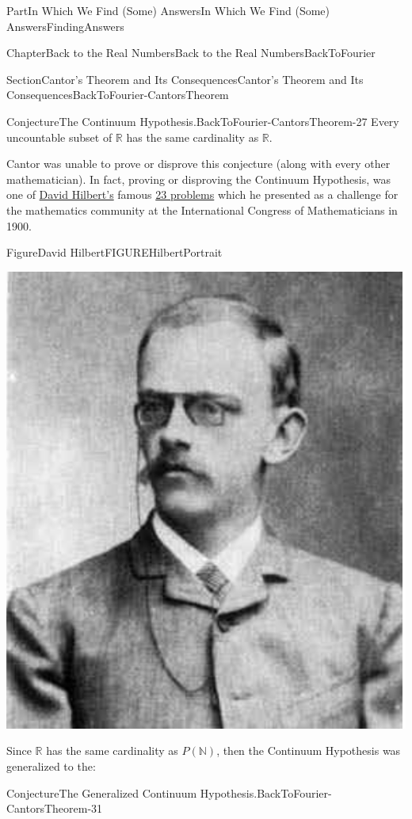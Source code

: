 \documentclass[oneside,10pt,]{book}
\numberwithin{equation}{part}
\newcommand{\RR}{\mathbb {R}}
\newcommand{\NN}{\mathbb {N}}
\begin{document}
\begin{partptx}{Part}{In Which We Find (Some) Answers}{}{In Which We Find (Some) Answers}{}{}{FindingAnswers}
\begin{chapterptx}{Chapter}{Back to the Real Numbers}{}{Back to the Real Numbers}{}{}{BackToFourier}
\begin{sectionptx}{Section}{Cantor's Theorem and Its Consequences}{}{Cantor's Theorem and Its Consequences}{}{}{BackToFourier-CantorsTheorem}
\begin{conjecture}{Conjecture}{The Continuum Hypothesis.}{}{BackToFourier-CantorsTheorem-27}
%
Every uncountable subset of \(\RR\) has the same cardinality as \(\RR\).%
\end{conjecture}
Cantor was unable to prove or disprove this conjecture (along with every other mathematician). In fact, proving or disproving the Continuum Hypothesis, was one of \href{https://mathshistory.st-andrews.ac.uk/Biographies/Hilbert/}{David Hilbert's} famous \href{https://mathshistory.st-andrews.ac.uk/Extras/Hilbert_Problems/}{23 problems} which he presented as a challenge for the mathematics community at the International Congress of Mathematicians in 1900.%
\begin{figureptx}{Figure}{David Hilbert}{FIGUREHilbertPortrait}{}%
%
%
\begin{image}{0.325}{0.35}{0.325}{}%
\includegraphics[width=\linewidth]{external/images/Hilbert.png}
\end{image}%
\tcblower
\end{figureptx}%
Since \(\RR\) has the same cardinality as \(P(\NN)\), then the Continuum Hypothesis was generalized to the:%
\begin{conjecture}{Conjecture}{The Generalized Continuum Hypothesis.}{}{BackToFourier-CantorsTheorem-31}%

\end{conjecture}
\end{sectionptx}
\end{chapterptx}
\end{partptx}
\end{document}
